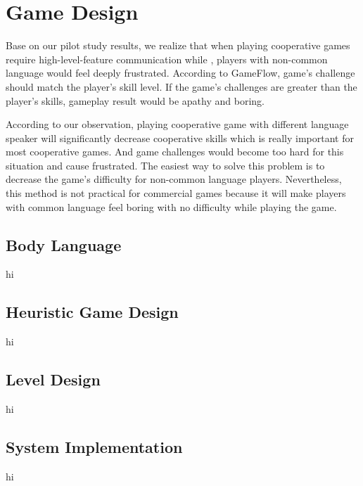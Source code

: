 \section{Game Design}


Base on our pilot study results, we realize that when playing cooperative games require high-level-feature communication while , players with non-common language would feel deeply frustrated. According to GameFlow\cite{GD1}, game's challenge should match the player's skill level. If the game's challenges are greater than the player's skills, gameplay result would be apathy and boring.


According to our observation, playing cooperative game with different language speaker will significantly decrease cooperative skills which is really important for most cooperative games. And game challenges would become too hard for this situation and cause frustrated. The easiest way to solve this problem is to decrease the game's difficulty for non-common language players. Nevertheless, this method is not practical for commercial games because it will make players with common language feel boring with no difficulty while playing the game.  

\subsection{Body Language}
hi
\subsection{Heuristic Game Design}
hi
\subsection{Level Design}
hi
\subsection{System Implementation}
hi
